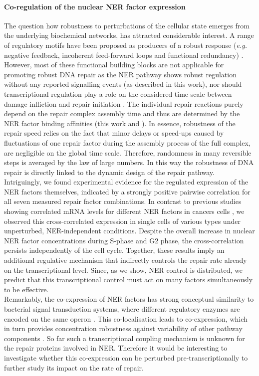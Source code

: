 \paragraph{Co-regulation of the nuclear NER factor expression}    The question how robustness to perturbations of the cellular state emerges from the underlying biochemical networks, has attracted considerable interest. A range of regulatory motifs have been proposed as producers of a robust response (\textit{e.g.} negative feedback, incoherent feed-forward loops and functional redundancy) \cite{Alon2007,Bleris2011,Yi2000,Manuscript2011}. However, most of these functional building blocks are not applicable for promoting robust DNA repair as the NER pathway shows robust regulation without any reported signalling events (as described in this work), nor should transcriptional regulation play a role on the considered time scale between damage infliction and repair initiation \cite{Mone2001}. The individual repair reactions purely depend on the repair complex assembly time and thus are determined by the NER factor binding affinities (this work and \cite{Luijsterburg2010}). In essence, robustness of the repair speed relies on the fact that minor delays or speed-ups caused by fluctuations of one repair factor during the assembly process of the full complex, are negligible on the global time scale. Therefore, randomness in many reversible steps is averaged by the law of large numbers. In this way the robustness of DNA repair is directly linked to the dynamic design of the repair pathway.\\     
Intriguingly, we found experimental evidence for the regulated expression of the NER factors themselves, indicated by a strongly positive pairwise correlation for all seven measured repair factor combinations. In contrast to previous studies showing correlated mRNA levels for different NER factors in cancers cells \cite{Damia1998,Cheng2000}, we observed this cross-correlated expression in single cells of various types under unperturbed, NER-independent conditions. Despite the overall increase in nuclear NER factor concentrations during S-phase and G2 phase, the cross-correlation persists independently of the cell cycle. Together, these results imply an additional regulative mechanism that indirectly controls the repair rate already on the transcriptional level. Since, as we show, NER control is distributed, we predict that this transcriptional control must act on many factors simultaneously to be effective.\\
Remarkably, the co-expression of NER factors has strong conceptual similarity to bacterial signal transduction systems, where different regulatory enzymes are encoded on the same operon \cite{Kollmann2005,Lovdok2009}. This co-localisation leads to co-expression, which in turn provides concentration robustness against variability of other pathway components \cite{Bluthgen2013}. So far such a transcriptional coupling mechanism is unknown for the repair proteins involved in NER. Therefore it would be interesting to investigate whether this co-expression can be perturbed pre-transcriptionally to further study its impact on the rate of repair. 

